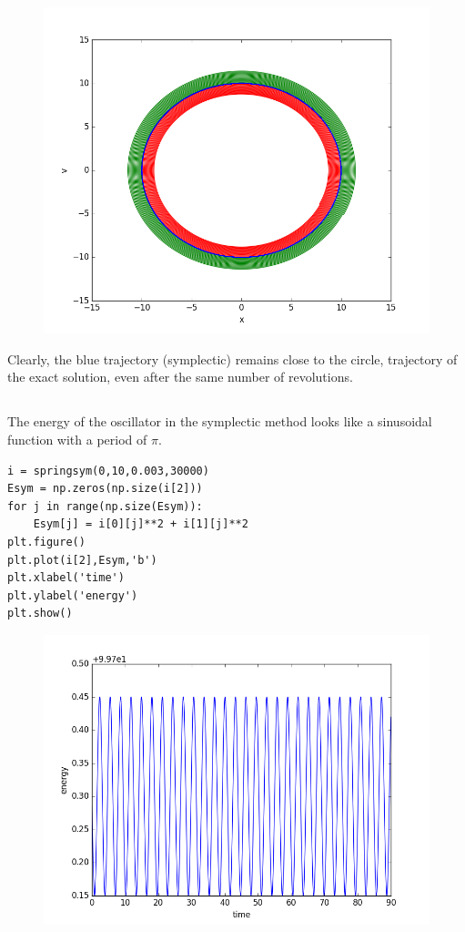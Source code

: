 \documentclass[10pt]{article}
\begin{document}
\begin{figure}[!h]
\centering
\includegraphics[scale=0.5]{w3fig10.png}
\end{figure}

Clearly, the blue trajectory (symplectic) remains close to the circle, trajectory of the exact solution, even after the same number of revolutions. 

\subsection{}
The energy of the oscillator in the symplectic method looks like a sinusoidal function with a period of $\pi$. \\

\begin{lstlisting}
i = springsym(0,10,0.003,30000)
Esym = np.zeros(np.size(i[2]))
for j in range(np.size(Esym)):
    Esym[j] = i[0][j]**2 + i[1][j]**2
plt.figure()
plt.plot(i[2],Esym,'b')
plt.xlabel('time')
plt.ylabel('energy')
plt.show()
\end{lstlisting}

\begin{figure}[!h]
\centering
\includegraphics[scale=0.5]{w3fig11.png}
\end{figure}
\end{document}
